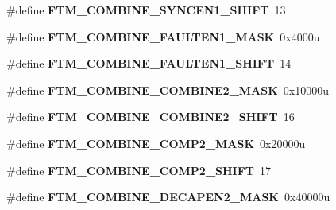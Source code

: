 \begin{DoxyCompactItemize}
\item 
\#define {\bfseries F\+T\+M\+\_\+\+C\+O\+M\+B\+I\+N\+E\+\_\+\+S\+Y\+N\+C\+E\+N1\+\_\+\+S\+H\+I\+FT}~13\hypertarget{group__FTM__Register__Masks_ga5190e8c0896bf03060b19eb8b4a0c524}{}\label{group__FTM__Register__Masks_ga5190e8c0896bf03060b19eb8b4a0c524}

\item 
\#define {\bfseries F\+T\+M\+\_\+\+C\+O\+M\+B\+I\+N\+E\+\_\+\+F\+A\+U\+L\+T\+E\+N1\+\_\+\+M\+A\+SK}~0x4000u\hypertarget{group__FTM__Register__Masks_ga80468385e5f9888483457adac7de12f1}{}\label{group__FTM__Register__Masks_ga80468385e5f9888483457adac7de12f1}

\item 
\#define {\bfseries F\+T\+M\+\_\+\+C\+O\+M\+B\+I\+N\+E\+\_\+\+F\+A\+U\+L\+T\+E\+N1\+\_\+\+S\+H\+I\+FT}~14\hypertarget{group__FTM__Register__Masks_gaf889dddf3bfe69e1fde16e5386ab5204}{}\label{group__FTM__Register__Masks_gaf889dddf3bfe69e1fde16e5386ab5204}

\item 
\#define {\bfseries F\+T\+M\+\_\+\+C\+O\+M\+B\+I\+N\+E\+\_\+\+C\+O\+M\+B\+I\+N\+E2\+\_\+\+M\+A\+SK}~0x10000u\hypertarget{group__FTM__Register__Masks_gaf6def48c41b38acef5263e8d8f440901}{}\label{group__FTM__Register__Masks_gaf6def48c41b38acef5263e8d8f440901}

\item 
\#define {\bfseries F\+T\+M\+\_\+\+C\+O\+M\+B\+I\+N\+E\+\_\+\+C\+O\+M\+B\+I\+N\+E2\+\_\+\+S\+H\+I\+FT}~16\hypertarget{group__FTM__Register__Masks_ga9ec484c5c6125951d7528fe755040d09}{}\label{group__FTM__Register__Masks_ga9ec484c5c6125951d7528fe755040d09}

\item 
\#define {\bfseries F\+T\+M\+\_\+\+C\+O\+M\+B\+I\+N\+E\+\_\+\+C\+O\+M\+P2\+\_\+\+M\+A\+SK}~0x20000u\hypertarget{group__FTM__Register__Masks_gaf15b9cb1ec9fce30f4442d387e6e6c11}{}\label{group__FTM__Register__Masks_gaf15b9cb1ec9fce30f4442d387e6e6c11}

\item 
\#define {\bfseries F\+T\+M\+\_\+\+C\+O\+M\+B\+I\+N\+E\+\_\+\+C\+O\+M\+P2\+\_\+\+S\+H\+I\+FT}~17\hypertarget{group__FTM__Register__Masks_ga6f9c535470be4fce32ae6edc8a9fd54a}{}\label{group__FTM__Register__Masks_ga6f9c535470be4fce32ae6edc8a9fd54a}

\item 
\#define {\bfseries F\+T\+M\+\_\+\+C\+O\+M\+B\+I\+N\+E\+\_\+\+D\+E\+C\+A\+P\+E\+N2\+\_\+\+M\+A\+SK}~0x40000u\hypertarget{group__FTM__Register__Masks_ga38101c934966b16d7394e32a393a5adf}{}\label{group__FTM__Register__Masks_ga38101c934966b16d7394e32a393a5adf}


\end{DoxyCompactItemize}
